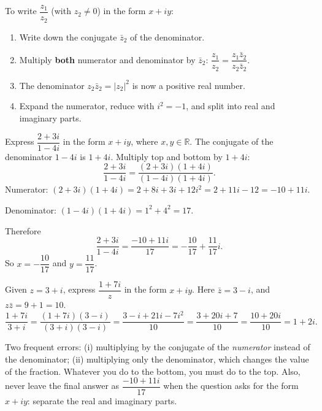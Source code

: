 \documentclass[11pt]{article}
\begin{document}
\begin{methode}
To write $\dfrac{z_{1}}{z_{2}}$ (with $z_{2}\neq 0$) in the form $x+iy$:
\begin{enumerate}
\item Write down the conjugate $\bar{z}_{2}$ of the denominator.
\item Multiply \textbf{both} numerator and denominator by $\bar{z}_{2}$: $\dfrac{z_{1}}{z_{2}}=\dfrac{z_{1}\bar{z}_{2}}{z_{2}\bar{z}_{2}}$.
\item The denominator $z_{2}\bar{z}_{2}=|z_{2}|^{2}$ is now a positive real number.
\item Expand the numerator, reduce with $i^{2}=-1$, and split into real and imaginary parts.
\end{enumerate}
\end{methode}

\begin{exoresolu}
Express $\dfrac{2+3i}{1-4i}$ in the form $x+iy$, where $x,y\in\mathbb{R}$.
\tcblower
The conjugate of the denominator $1-4i$ is $1+4i$. Multiply top and bottom by $1+4i$:
\[
\frac{2+3i}{1-4i}=\frac{(2+3i)(1+4i)}{(1-4i)(1+4i)}.
\]
Numerator: $(2+3i)(1+4i)=2+8i+3i+12i^{2}=2+11i-12=-10+11i$.

Denominator: $(1-4i)(1+4i)=1^{2}+4^{2}=17$.

Therefore
\[
\frac{2+3i}{1-4i}=\frac{-10+11i}{17}=-\frac{10}{17}+\frac{11}{17}i.
\]
So $x=-\dfrac{10}{17}$ and $y=\dfrac{11}{17}$.
\end{exoresolu}

\begin{exoresolu}
Given $z=3+i$, express $\dfrac{1+7i}{z}$ in the form $x+iy$.
\tcblower
Here $\bar{z}=3-i$, and $z\bar{z}=9+1=10$.
\[
\frac{1+7i}{3+i}=\frac{(1+7i)(3-i)}{(3+i)(3-i)}=\frac{3-i+21i-7i^{2}}{10}=\frac{3+20i+7}{10}=\frac{10+20i}{10}=1+2i.
\]
\end{exoresolu}

\begin{attention}
Two frequent errors: (i) multiplying by the conjugate of the \emph{numerator} instead of the denominator; (ii) multiplying only the denominator, which changes the value of the fraction. Whatever you do to the bottom, you must do to the top. Also, never leave the final answer as $\dfrac{-10+11i}{17}$ when the question asks for the form $x+iy$: separate the real and imaginary parts.
\end{attention}
\end{document}
